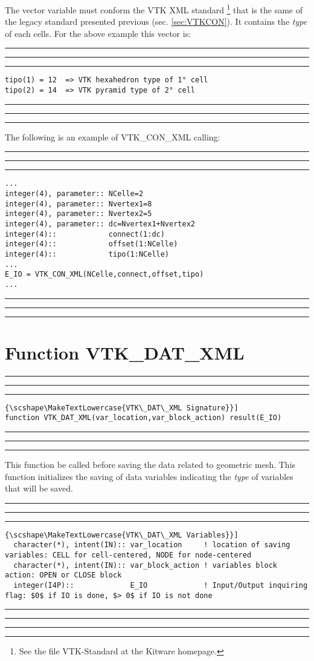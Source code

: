 \documentclass[pagesize=pdftex,fontsize=10pt,paper=a4,oneside]{scrbook}
\DeclareRobustCommand{\MarginNote}[1]{\marginpar{%
\slshape\footnotesize%
\parindent=0pt\lineskip=0pt\lineskiplimit=0pt%
\tolerance=2000\hyphenpenalty=300\exhyphenpenalty=300%
\doublehyphendemerits=100000\finalhyphendemerits=\doublehyphendemerits%
\raggedright\hspace{0pt}#1}}
\newenvironment{boxred}[1]%
               {%
                \noindent\hspace*{-0.025\textwidth}%
                \color{Maroon}%
                \rule[-5.8pt]{0.6pt}{6pt}\hspace*{-0.6pt}\rule{1.05\textwidth}{0.6pt}\hspace*{-0.6pt}\rule[-5.8pt]{0.6pt}{6pt}%
                \color{black}%
                \vspace*{0.6pt}\MarginNote{\color{Maroon}{#1}}%
               }%
               {%
                \noindent\hspace*{-0.025\textwidth}%
                \color{Maroon}%
                \rule[0pt]{0.6pt}{6pt}\hspace*{-0.6pt}\rule{1.05\textwidth}{0.6pt}\hspace*{-0.6pt}\rule[0pt]{0.6pt}{6pt}%
                \color{black}%
                \vspace*{2mm}%
               }
\DeclareRobustCommand{\MaiuscolettoBS}[1]{\textls[80]{\scshape\MakeTextLowercase{#1}}}
\begin{document}
The vector variable \MaiuscolettoBS{tipo} must conform the VTK XML standard \footnote{See the file VTK-Standard at the
Kitware homepage.} that is the same of the legacy standard presented previous (sec. \ref{sec:VTKCON}). It contains the
\emph{type} of each cells. For the above example this vector is:

\begin{boxred}{Cell-Type vector example for VTK legacy standard}
\begin{verbatim}
tipo(1) = 12  => VTK hexahedron type of 1° cell
tipo(2) = 14  => VTK pyramid type of 2° cell
\end{verbatim}
\end{boxred}

The following is an example of VTK\_CON\_XML calling:

\begin{boxred}{VTK\_CON\_XML Calling}
\begin{verbatim}
...
integer(4), parameter:: NCelle=2
integer(4), parameter:: Nvertex1=8
integer(4), parameter:: Nvertex2=5
integer(4), parameter:: dc=Nvertex1+Nvertex2
integer(4)::            connect(1:dc)
integer(4)::            offset(1:NCelle)
integer(4)::            tipo(1:NCelle)
...
E_IO = VTK_CON_XML(NCelle,connect,offset,tipo)
...
\end{verbatim}
\end{boxred}


\section{Function VTK\_DAT\_XML}
\label{fun:VTK_DAT_XML}
 
 
\begin{boxred}{}
\begin{lstlisting}[style=signature,title=\color{Maroon}\MaiuscolettoBS{VTK\_DAT\_XML Signature}]
function VTK_DAT_XML(var_location,var_block_action) result(E_IO)
\end{lstlisting}
\end{boxred}
 
This function \MaiuscolettoBS{must} be called before saving the data related to geometric mesh. This function initializes
the saving of data variables indicating the \emph{type} of variables that will be saved.


 
\begin{boxred}{}
\begin{lstlisting}[style=variables,title=\color{Maroon}\MaiuscolettoBS{VTK\_DAT\_XML Variables}]
  character(*), intent(IN):: var_location     ! location of saving variables: CELL for cell-centered, NODE for node-centered
  character(*), intent(IN):: var_block_action ! variables block action: OPEN or CLOSE block
  integer(I4P)::             E_IO             ! Input/Output inquiring flag: $0$ if IO is done, $> 0$ if IO is not done
\end{lstlisting}

\end{boxred}
 
\end{document}
